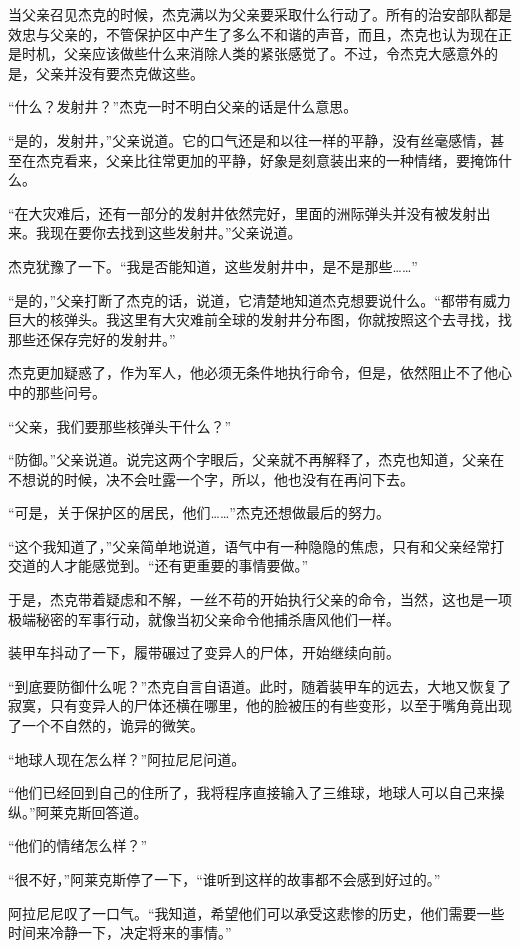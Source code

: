 当父亲召见杰克的时候，杰克满以为父亲要采取什么行动了。所有的治安部队都是效忠与父亲的，不管保护区中产生了多么不和谐的声音，而且，杰克也认为现在正是时机，父亲应该做些什么来消除人类的紧张感觉了。不过，令杰克大感意外的是，父亲并没有要杰克做这些。

“什么？发射井？”杰克一时不明白父亲的话是什么意思。

“是的，发射井，”父亲说道。它的口气还是和以往一样的平静，没有丝毫感情，甚至在杰克看来，父亲比往常更加的平静，好象是刻意装出来的一种情绪，要掩饰什么。

“在大灾难后，还有一部分的发射井依然完好，里面的洲际弹头并没有被发射出来。我现在要你去找到这些发射井。”父亲说道。

杰克犹豫了一下。“我是否能知道，这些发射井中，是不是那些……”

“是的，”父亲打断了杰克的话，说道，它清楚地知道杰克想要说什么。“都带有威力巨大的核弹头。我这里有大灾难前全球的发射井分布图，你就按照这个去寻找，找那些还保存完好的发射井。”

杰克更加疑惑了，作为军人，他必须无条件地执行命令，但是，依然阻止不了他心中的那些问号。

“父亲，我们要那些核弹头干什么？”

“防御。”父亲说道。说完这两个字眼后，父亲就不再解释了，杰克也知道，父亲在不想说的时候，决不会吐露一个字，所以，他也没有在再问下去。

“可是，关于保护区的居民，他们……”杰克还想做最后的努力。

“这个我知道了，”父亲简单地说道，语气中有一种隐隐的焦虑，只有和父亲经常打交道的人才能感觉到。“还有更重要的事情要做。”

于是，杰克带着疑虑和不解，一丝不苟的开始执行父亲的命令，当然，这也是一项极端秘密的军事行动，就像当初父亲命令他捕杀唐风他们一样。

装甲车抖动了一下，履带碾过了变异人的尸体，开始继续向前。

“到底要防御什么呢？”杰克自言自语道。此时，随着装甲车的远去，大地又恢复了寂寞，只有变异人的尸体还横在哪里，他的脸被压的有些变形，以至于嘴角竟出现了一个不自然的，诡异的微笑。

“地球人现在怎么样？”阿拉尼尼问道。

“他们已经回到自己的住所了，我将程序直接输入了三维球，地球人可以自己来操纵。”阿莱克斯回答道。

“他们的情绪怎么样？”

“很不好，”阿莱克斯停了一下，“谁听到这样的故事都不会感到好过的。”

阿拉尼尼叹了一口气。“我知道，希望他们可以承受这悲惨的历史，他们需要一些时间来冷静一下，决定将来的事情。”

